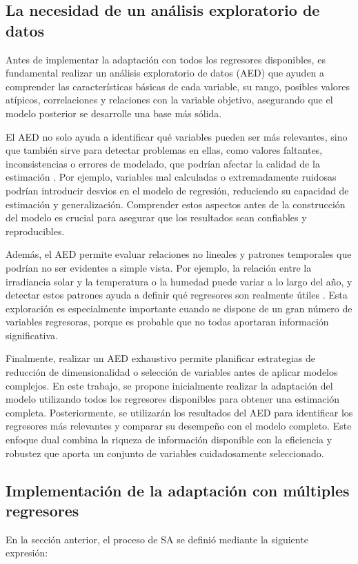 \subsection{La necesidad de un análisis exploratorio de datos}

Antes de implementar la adaptación con todos los regresores disponibles, es fundamental realizar un análisis exploratorio de datos (AED) que ayuden a comprender las características básicas de cada variable, su rango, posibles valores atípicos, correlaciones y relaciones con la variable objetivo, asegurando que el modelo posterior se desarrolle una base más sólida.  

El AED no solo ayuda a identificar qué variables pueden ser más relevantes, sino que también sirve para detectar problemas en ellas, como valores faltantes, inconsistencias o errores de modelado, que podrían afectar la calidad de la estimación \citep{Tukey1977, Behrens1997, Wilks2006}. Por ejemplo, variables mal calculadas o extremadamente ruidosas podrían introducir desvios en el modelo de regresión, reduciendo su capacidad de estimación y generalización. Comprender estos aspectos antes de la construcción del modelo es crucial para asegurar que los resultados sean confiables y reproducibles.  

Además, el AED permite evaluar relaciones no lineales y patrones temporales que podrían no ser evidentes a simple vista. Por ejemplo, la relación entre la irradiancia solar y la temperatura o la humedad puede variar a lo largo del año, y detectar estos patrones ayuda a definir qué regresores son realmente útiles \citep{ Kuhn2013}. Esta exploración es especialmente importante cuando se dispone de un gran número de variables regresoras, porque es probable que no todas aportaran información significativa.  

Finalmente, realizar un AED exhaustivo permite planificar estrategias de reducción de dimensionalidad o selección de variables antes de aplicar modelos complejos. En este trabajo, se propone inicialmente realizar la adaptación del modelo utilizando todos los regresores disponibles para obtener una estimación completa. Posteriormente, se utilizarán los resultados del AED para identificar los regresores más relevantes y comparar su desempeño con el modelo completo. Este enfoque dual combina la riqueza de información disponible con la eficiencia y robustez que aporta un conjunto de variables cuidadosamente seleccionado.  

\subsection{Implementación de la adaptación con múltiples regresores}
En la sección anterior, el proceso de SA se definió mediante la siguiente expresión:

